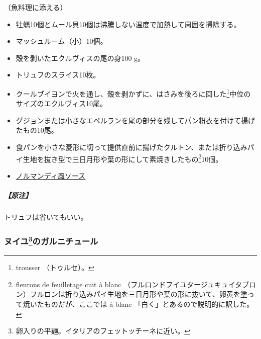 \begin{recette}


（魚料理に添える）

\begin{itemize}
\item
  牡蠣10個とムール貝10個は沸騰しない温度で加熱して周囲を掃除する。
\item
  マッシュルーム（小）10個。
\item
  殻を剥いたエクルヴィスの尾の身100 g。
\item
  トリュフのスライス10枚。
\item
  クールブイヨンで火を通し、殻を剥かずに、はさみを後ろに回した\footnote{trousser
    （トゥルセ）。}中位のサイズのエクルヴィス10尾。
\item
  グジョンまたは小さなエペルランを尾の部分を残してパン粉衣を付けて揚げたもの10尾。
\item
  食パンを小さな菱形に切って提供直前に揚げたクルトン、または折り込みパイ生地を抜き型で三日月形や葉の形にして素焼きしたもの\footnote{fleurons
    de feuilletage cuit à blanc
    （フルロンドフイユタージュキュイタブロン）フルロンは折り込みパイ生地を三日月形や葉の形に抜いて、卵黄を塗って焼いたものだが、ここでは
    à blanc 「白く」とあるので説明的に訳した。}10個。
\item
  \protect\hyperlink{sauce-normande}{ノルマンディ風ソース}
\end{itemize}

\hypertarget{ux539fux6ce8}{%
\subparagraph{【原注】}\label{ux539fux6ce8}}

トリュフは省いてもいい。

\atoaki{}

\hypertarget{garniture-de-nouilles}{%
\subsubsection[ヌイユのガルニチュール]{\texorpdfstring{ヌイユ\footnote{卵入りの平麺。イタリアのフェットッチーネに近い。}のガルニチュール}{ヌイユのガルニチュール}}\label{garniture-de-nouilles}}




\end{recette}
